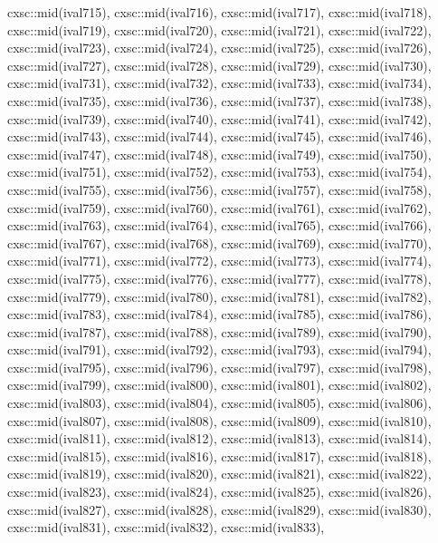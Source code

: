 \begin{DoxyCode}
{  cxsc::mid(ival715),
  cxsc::mid(ival716),
  cxsc::mid(ival717),
  cxsc::mid(ival718),
  cxsc::mid(ival719),
  cxsc::mid(ival720),
  cxsc::mid(ival721),
  cxsc::mid(ival722),
  cxsc::mid(ival723),
  cxsc::mid(ival724),
  cxsc::mid(ival725),
  cxsc::mid(ival726),
  cxsc::mid(ival727),
  cxsc::mid(ival728),
  cxsc::mid(ival729),
  cxsc::mid(ival730),
  cxsc::mid(ival731),
  cxsc::mid(ival732),
  cxsc::mid(ival733),
  cxsc::mid(ival734),
  cxsc::mid(ival735),
  cxsc::mid(ival736),
  cxsc::mid(ival737),
  cxsc::mid(ival738),
  cxsc::mid(ival739),
  cxsc::mid(ival740),
  cxsc::mid(ival741),
  cxsc::mid(ival742),
  cxsc::mid(ival743),
  cxsc::mid(ival744),
  cxsc::mid(ival745),
  cxsc::mid(ival746),
  cxsc::mid(ival747),
  cxsc::mid(ival748),
  cxsc::mid(ival749),
  cxsc::mid(ival750),
  cxsc::mid(ival751),
  cxsc::mid(ival752),
  cxsc::mid(ival753),
  cxsc::mid(ival754),
  cxsc::mid(ival755),
  cxsc::mid(ival756),
  cxsc::mid(ival757),
  cxsc::mid(ival758),
  cxsc::mid(ival759),
  cxsc::mid(ival760),
  cxsc::mid(ival761),
  cxsc::mid(ival762),
  cxsc::mid(ival763),
  cxsc::mid(ival764),
  cxsc::mid(ival765),
  cxsc::mid(ival766),
  cxsc::mid(ival767),
  cxsc::mid(ival768),
  cxsc::mid(ival769),
  cxsc::mid(ival770),
  cxsc::mid(ival771),
  cxsc::mid(ival772),
  cxsc::mid(ival773),
  cxsc::mid(ival774),
  cxsc::mid(ival775),
  cxsc::mid(ival776),
  cxsc::mid(ival777),
  cxsc::mid(ival778),
  cxsc::mid(ival779),
  cxsc::mid(ival780),
  cxsc::mid(ival781),
  cxsc::mid(ival782),
  cxsc::mid(ival783),
  cxsc::mid(ival784),
  cxsc::mid(ival785),
  cxsc::mid(ival786),
  cxsc::mid(ival787),
  cxsc::mid(ival788),
  cxsc::mid(ival789),
  cxsc::mid(ival790),
  cxsc::mid(ival791),
  cxsc::mid(ival792),
  cxsc::mid(ival793),
  cxsc::mid(ival794),
  cxsc::mid(ival795),
  cxsc::mid(ival796),
  cxsc::mid(ival797),
  cxsc::mid(ival798),
  cxsc::mid(ival799),
  cxsc::mid(ival800),
  cxsc::mid(ival801),
  cxsc::mid(ival802),
  cxsc::mid(ival803),
  cxsc::mid(ival804),
  cxsc::mid(ival805),
  cxsc::mid(ival806),
  cxsc::mid(ival807),
  cxsc::mid(ival808),
  cxsc::mid(ival809),
  cxsc::mid(ival810),
  cxsc::mid(ival811),
  cxsc::mid(ival812),
  cxsc::mid(ival813),
  cxsc::mid(ival814),
  cxsc::mid(ival815),
  cxsc::mid(ival816),
  cxsc::mid(ival817),
  cxsc::mid(ival818),
  cxsc::mid(ival819),
  cxsc::mid(ival820),
  cxsc::mid(ival821),
  cxsc::mid(ival822),
  cxsc::mid(ival823),
  cxsc::mid(ival824),
  cxsc::mid(ival825),
  cxsc::mid(ival826),
  cxsc::mid(ival827),
  cxsc::mid(ival828),
  cxsc::mid(ival829),
  cxsc::mid(ival830),
  cxsc::mid(ival831),
  cxsc::mid(ival832),
  cxsc::mid(ival833),
}
\end{DoxyCode}
